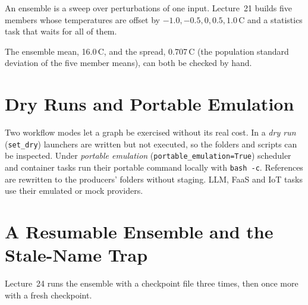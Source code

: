 

An ensemble is a sweep over perturbations of one input. Lecture~21 builds five
members whose temperatures are offset by $-1.0, -0.5, 0, 0.5, 1.0$\,\textdegree C
and a statistics task that waits for all of them.



The ensemble mean, 16.0\,\textdegree C, and the spread, 0.707\,\textdegree C
(the population standard deviation of the five member means), can both be
checked by hand.

\section{Dry Runs and Portable Emulation}

Two workflow modes let a graph be exercised without its real cost. In a
\emph{dry run} (\texttt{set\_dry}) launchers are written but not executed, so
the folders and scripts can be inspected. Under \emph{portable emulation}
(\texttt{portable\_emulation=True}) scheduler and container tasks run their
portable command locally with \texttt{bash -c}. References are rewritten to
the producers' folders without staging. LLM, FaaS and IoT tasks use their
emulated or mock providers.



\section{A Resumable Ensemble and the Stale-Name Trap}

Lecture~24 runs the ensemble with a checkpoint file three times, then once
more with a fresh checkpoint.





